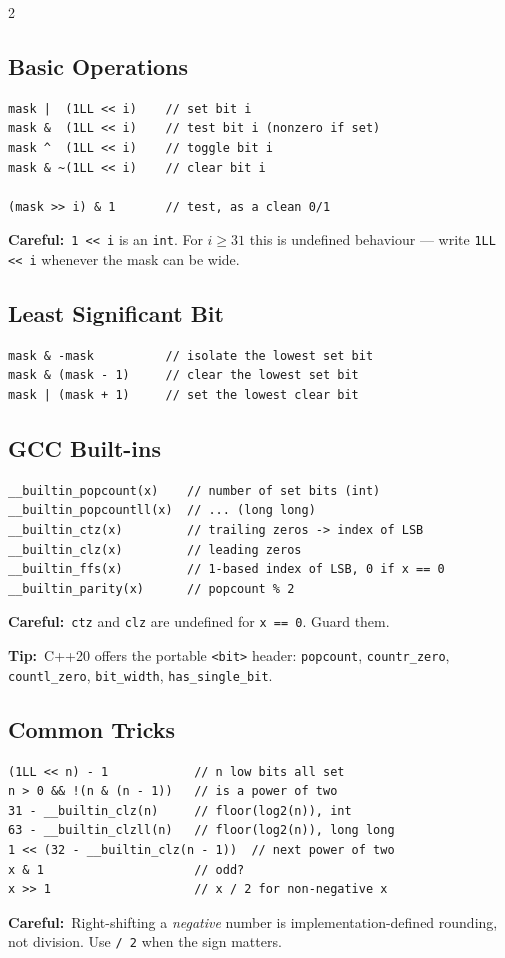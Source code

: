 \documentclass[10pt]{article}
\newcommand{\code}[1]{\texttt{\small #1}}
\newcommand{\tip}[1]{{\color{tipc}\footnotesize\textbf{Tip:}}~{\footnotesize #1}\par}
\newcommand{\warn}[1]{{\color{warnc}\footnotesize\textbf{Careful:}}~{\footnotesize #1}\par}
\begin{document}
\begin{multicols}{2}

\subsection{Basic Operations}
\begin{lstlisting}
mask |  (1LL << i)    // set bit i
mask &  (1LL << i)    // test bit i (nonzero if set)
mask ^  (1LL << i)    // toggle bit i
mask & ~(1LL << i)    // clear bit i

(mask >> i) & 1       // test, as a clean 0/1
\end{lstlisting}
\warn{\code{1 << i} is an \code{int}. For $i \ge 31$ this is undefined
behaviour --- write \code{1LL << i} whenever the mask can be wide.}

\subsection{Least Significant Bit}
\begin{lstlisting}
mask & -mask          // isolate the lowest set bit
mask & (mask - 1)     // clear the lowest set bit
mask | (mask + 1)     // set the lowest clear bit
\end{lstlisting}

\subsection{GCC Built-ins}
\begin{lstlisting}
__builtin_popcount(x)    // number of set bits (int)
__builtin_popcountll(x)  // ... (long long)
__builtin_ctz(x)         // trailing zeros -> index of LSB
__builtin_clz(x)         // leading zeros
__builtin_ffs(x)         // 1-based index of LSB, 0 if x == 0
__builtin_parity(x)      // popcount % 2
\end{lstlisting}
\warn{\code{ctz} and \code{clz} are undefined for \code{x == 0}. Guard
them.}
\tip{C++20 offers the portable \code{<bit>} header:
\code{popcount}, \code{countr\_zero}, \code{countl\_zero},
\code{bit\_width}, \code{has\_single\_bit}.}

\subsection{Common Tricks}
\begin{lstlisting}
(1LL << n) - 1            // n low bits all set
n > 0 && !(n & (n - 1))   // is a power of two
31 - __builtin_clz(n)     // floor(log2(n)), int
63 - __builtin_clzll(n)   // floor(log2(n)), long long
1 << (32 - __builtin_clz(n - 1))  // next power of two
x & 1                     // odd?
x >> 1                    // x / 2 for non-negative x
\end{lstlisting}
\warn{Right-shifting a \emph{negative} number is implementation-defined
rounding, not division. Use \code{/ 2} when the sign matters.}


\end{multicols}
\end{document}
